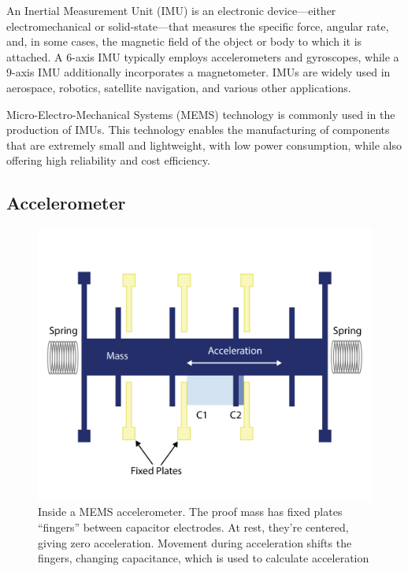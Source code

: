 \documentclass[english, bachelor, utf8]{base/thesis_telematics}
\begin{document}
An Inertial Measurement Unit (IMU) is an electronic device—either electromechanical or solid-state—that measures the specific force, angular rate, and, in some cases, the magnetic field of the object or body to which it is attached.
A 6-axis IMU typically employs accelerometers and gyroscopes, while a 9-axis IMU additionally incorporates a magnetometer. IMUs are widely used in aerospace, robotics, satellite navigation, and various other applications.

Micro-Electro-Mechanical Systems (MEMS) technology is commonly used in the production of IMUs. This technology enables the manufacturing of components that are extremely small and lightweight, with low power consumption, while also offering high reliability and cost efficiency. \cite{advnav_imu_intro,stanford_gps_lab_imu_testing}
\subsection{Accelerometer}

\begin{figure}[ht]
\centering
\includegraphics[width=\columnwidth]{pics/accel_inside.png}
\caption{Inside a MEMS accelerometer. The proof mass has fixed plates “fingers” between capacitor electrodes. At rest, they’re centered, giving zero acceleration. Movement during acceleration shifts the fingers, changing capacitance, which is used to calculate acceleration\cite{ericco_mems_accel_vibrations}}
\label{fig:inside_accel}
\end{figure}
\end{document}
